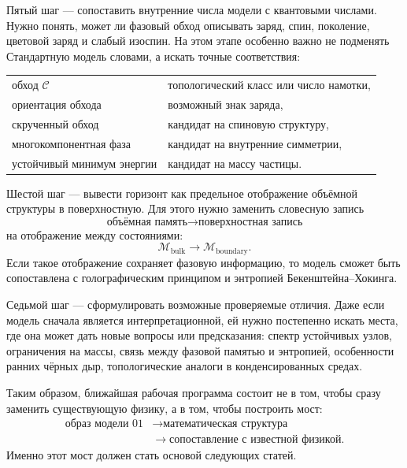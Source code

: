 \documentclass[11pt,a4paper]{article}
\newcommand{\contour}{\mathcal{C}}
\begin{document}
Пятый шаг --- сопоставить внутренние числа модели с квантовыми числами. Нужно понять, может ли фазовый обход описывать заряд, спин, поколение, цветовой заряд и слабый изоспин. На этом этапе особенно важно не подменять Стандартную модель словами, а искать точные соответствия:
\begin{center}
\begin{tabular}{ll}
обход $\contour$ & топологический класс или число намотки, \\
ориентация обхода & возможный знак заряда, \\
скрученный обход & кандидат на спиновую структуру, \\
многокомпонентная фаза & кандидат на внутренние симметрии, \\
устойчивый минимум энергии & кандидат на массу частицы.
\end{tabular}
\end{center}

Шестой шаг --- вывести горизонт как предельное отображение объёмной структуры в поверхностную. Для этого нужно заменить словесную запись
\begin{equation}
\text{объёмная память} \to \text{поверхностная запись}
\end{equation}
на отображение между состояниями:
\begin{equation}
\mathcal{M}_{\mathrm{bulk}} \longrightarrow \mathcal{M}_{\mathrm{boundary}}.
\end{equation}
Если такое отображение сохраняет фазовую информацию, то модель сможет быть сопоставлена с голографическим принципом и энтропией Бекенштейна--Хокинга.

Седьмой шаг --- сформулировать возможные проверяемые отличия. Даже если модель сначала является интерпретационной, ей нужно постепенно искать места, где она может дать новые вопросы или предсказания: спектр устойчивых узлов, ограничения на массы, связь между фазовой памятью и энтропией, особенности ранних чёрных дыр, топологические аналоги в конденсированных средах.

Таким образом, ближайшая рабочая программа состоит не в том, чтобы сразу заменить существующую физику, а в том, чтобы построить мост:
\begin{equation}
\begin{aligned}
\text{образ модели 01}
&\longrightarrow \text{математическая структура} \\
&\longrightarrow \text{сопоставление с известной физикой}.
\end{aligned}
\end{equation}
Именно этот мост должен стать основой следующих статей.
\end{document}
